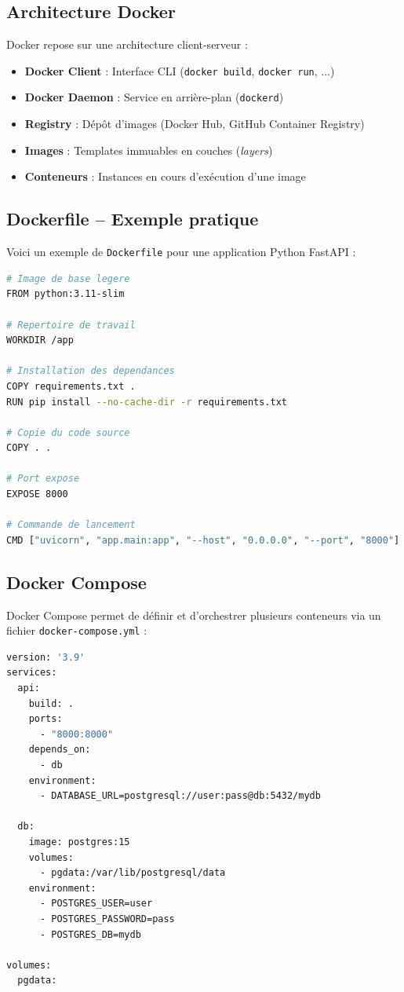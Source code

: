 \documentclass[12pt,a4paper]{article}
\begin{document}
\subsection{Architecture Docker}

Docker repose sur une architecture client-serveur :

\begin{itemize}
    \item \textbf{Docker Client} : Interface CLI (\texttt{docker build}, \texttt{docker run}, ...)
    \item \textbf{Docker Daemon} : Service en arrière-plan (\texttt{dockerd})
    \item \textbf{Registry} : Dépôt d'images (Docker Hub, GitHub Container Registry)
    \item \textbf{Images} : Templates immuables en couches (\textit{layers})
    \item \textbf{Conteneurs} : Instances en cours d'exécution d'une image
\end{itemize}

\subsection{Dockerfile -- Exemple pratique}

Voici un exemple de \texttt{Dockerfile} pour une application Python FastAPI :

\begin{lstlisting}[language=bash, caption=Dockerfile pour une API Python]
# Image de base legere
FROM python:3.11-slim

# Repertoire de travail
WORKDIR /app

# Installation des dependances
COPY requirements.txt .
RUN pip install --no-cache-dir -r requirements.txt

# Copie du code source
COPY . .

# Port expose
EXPOSE 8000

# Commande de lancement
CMD ["uvicorn", "app.main:app", "--host", "0.0.0.0", "--port", "8000"]
\end{lstlisting}

\subsection{Docker Compose}

Docker Compose permet de définir et d'orchestrer plusieurs conteneurs via un fichier \texttt{docker-compose.yml} :

\begin{lstlisting}[language=bash, caption=Exemple docker-compose.yml]
version: '3.9'
services:
  api:
    build: .
    ports:
      - "8000:8000"
    depends_on:
      - db
    environment:
      - DATABASE_URL=postgresql://user:pass@db:5432/mydb

  db:
    image: postgres:15
    volumes:
      - pgdata:/var/lib/postgresql/data
    environment:
      - POSTGRES_USER=user
      - POSTGRES_PASSWORD=pass
      - POSTGRES_DB=mydb

volumes:
  pgdata:
\end{lstlisting}
\end{document}
